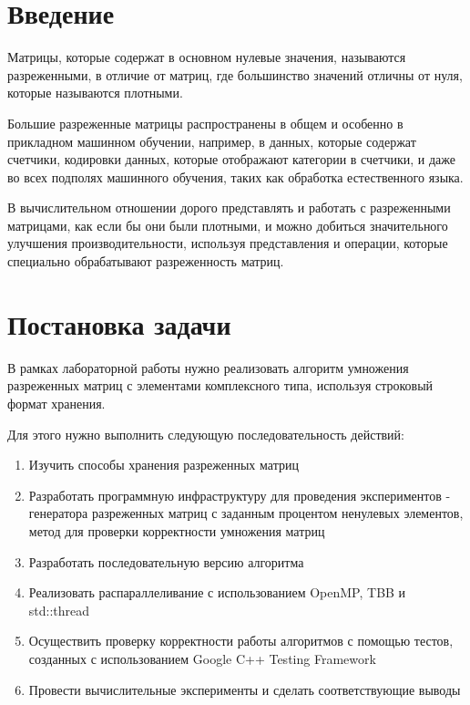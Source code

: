 \documentclass{report}
\begin{document}
\setcounter{page}{2}

\tableofcontents
\newpage

\section*{Введение}
Матрицы, которые содержат в основном нулевые значения, называются разреженными, в отличие от матриц, где большинство значений отличны от нуля, которые называются плотными.

Большие разреженные матрицы распространены в общем и особенно в прикладном машинном обучении, например, в данных, которые содержат счетчики, кодировки данных, которые отображают категории в счетчики, и даже во всех подполях машинного обучения, таких как обработка естественного языка.

В вычислительном отношении дорого представлять и работать с разреженными матрицами, как если бы они были плотными, и можно добиться значительного улучшения производительности, используя представления и операции, которые специально обрабатывают разреженность матриц.

\newpage

\section*{Постановка задачи}
В рамках лабораторной работы нужно реализовать алгоритм умножения разреженных матриц с элементами комплексного типа, используя строковый формат хранения.

\par Для этого нужно выполнить следующую последовательность действий:

\begin{enumerate}
\item Изучить способы хранения разреженных матриц
\item Разработать программную инфраструктуру для проведения экспериментов - генератора разреженных матриц с заданным процентом ненулевых элементов, метод для проверки корректности умножения матриц
\item Разработать последовательную версию алгоритма
\item Реализовать распараллеливание с использованием OpenMP, TBB и std::thread
\item Осуществить проверку корректности работы алгоритмов с помощью тестов, созданных с использованием Google C++ Testing Framework
\item Провести вычислительные эксперименты и сделать соответствующие выводы
\end{enumerate}
\newpage
\end{document}
